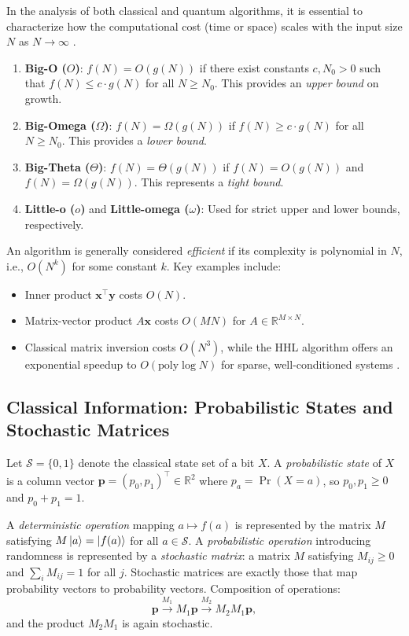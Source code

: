 \documentclass[aps, reprint, twocolumn, superscriptaddress, floatfix]{revtex4-2}
\begin{document}
In the analysis of both classical and quantum algorithms, it is essential to characterize how the computational cost (time or space) scales with the input size $N$ as $N \to \infty$ \cite{bernstein1997quantum}.
\begin{enumerate}
    \item \textbf{Big-O ($O$)}: $f(N) = O(g(N))$ if there exist constants $c, N_0 > 0$ such that $f(N) \le c \cdot g(N)$ for all $N \ge N_0$. This provides an \emph{upper bound} on growth.
    \item \textbf{Big-Omega ($\Omega$)}: $f(N) = \Omega(g(N))$ if $f(N) \ge c \cdot g(N)$ for all $N \ge N_0$. This provides a \emph{lower bound}.
    \item \textbf{Big-Theta ($\Theta$)}: $f(N) = \Theta(g(N))$ if $f(N) = O(g(N))$ and $f(N) = \Omega(g(N))$. This represents a \emph{tight bound}.
    \item \textbf{Little-o ($o$)} and \textbf{Little-omega ($\omega$)}: Used for strict upper and lower bounds, respectively.
\end{enumerate}
An algorithm is generally considered \emph{efficient} if its complexity is polynomial in $N$, i.e., $O(N^k)$ for some constant $k$. Key examples include:
\begin{itemize}
    \item Inner product $\mathbf{x}^\top\mathbf{y}$ costs $O(N)$.
    \item Matrix-vector product $A\mathbf{x}$ costs $O(MN)$ for $A\in\mathbb{R}^{M\times N}$.
    \item Classical matrix inversion costs $O(N^3)$, while the HHL algorithm offers an exponential speedup to $O(\text{poly}\log N)$ for sparse, well-conditioned systems \cite{harrow2009quantum}.
\end{itemize}

\subsection{Classical Information: Probabilistic States and Stochastic Matrices}
\label{ssec:classical-info}

Let $\mathcal{S} = \{0,1\}$ denote the classical state set of a bit $X$.
A \emph{probabilistic state} of $X$ is a column vector
$\mathbf{p} = (p_0, p_1)^\top \in \mathbb{R}^2$ where $p_a = \Pr(X = a)$, so
$p_0, p_1 \ge 0$ and $p_0 + p_1 = 1$.

A \emph{deterministic operation} mapping $a \mapsto f(a)$ is represented by the
matrix $M$ satisfying $M\ket{a} = \ket{f(a)}$ for all $a \in \mathcal{S}$.
A \emph{probabilistic operation} introducing randomness is represented by a
\emph{stochastic matrix}: a matrix $M$ satisfying $M_{ij} \ge 0$ and $\sum_i
M_{ij} = 1$ for all $j$.  Stochastic matrices are exactly those that map
probability vectors to probability vectors.  Composition of operations:
\begin{equation}
  \mathbf{p} \xrightarrow{M_1} M_1 \mathbf{p} \xrightarrow{M_2}
  M_2 M_1 \mathbf{p},
\end{equation}
and the product $M_2 M_1$ is again stochastic.
\end{document}
